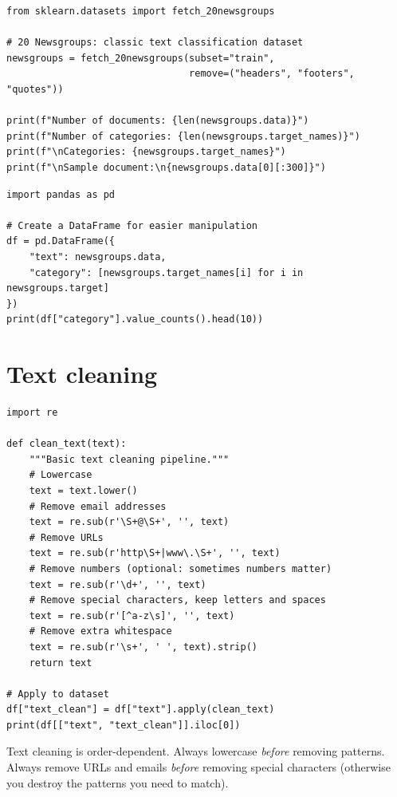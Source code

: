 \begin{verbatim}
from sklearn.datasets import fetch_20newsgroups

# 20 Newsgroups: classic text classification dataset
newsgroups = fetch_20newsgroups(subset="train",
                                remove=("headers", "footers", "quotes"))

print(f"Number of documents: {len(newsgroups.data)}")
print(f"Number of categories: {len(newsgroups.target_names)}")
print(f"\nCategories: {newsgroups.target_names}")
print(f"\nSample document:\n{newsgroups.data[0][:300]}")
\end{verbatim}

\begin{verbatim}
import pandas as pd

# Create a DataFrame for easier manipulation
df = pd.DataFrame({
    "text": newsgroups.data,
    "category": [newsgroups.target_names[i] for i in newsgroups.target]
})
print(df["category"].value_counts().head(10))
\end{verbatim}

\section{Text cleaning}

\begin{verbatim}
import re

def clean_text(text):
    """Basic text cleaning pipeline."""
    # Lowercase
    text = text.lower()
    # Remove email addresses
    text = re.sub(r'\S+@\S+', '', text)
    # Remove URLs
    text = re.sub(r'http\S+|www\.\S+', '', text)
    # Remove numbers (optional: sometimes numbers matter)
    text = re.sub(r'\d+', '', text)
    # Remove special characters, keep letters and spaces
    text = re.sub(r'[^a-z\s]', '', text)
    # Remove extra whitespace
    text = re.sub(r'\s+', ' ', text).strip()
    return text

# Apply to dataset
df["text_clean"] = df["text"].apply(clean_text)
print(df[["text", "text_clean"]].iloc[0])
\end{verbatim}

\begin{preprocesstip}
Text cleaning is order-dependent. Always lowercase \emph{before} removing patterns. Always remove URLs and emails \emph{before} removing special characters (otherwise you destroy the patterns you need to match).
\end{preprocesstip}

